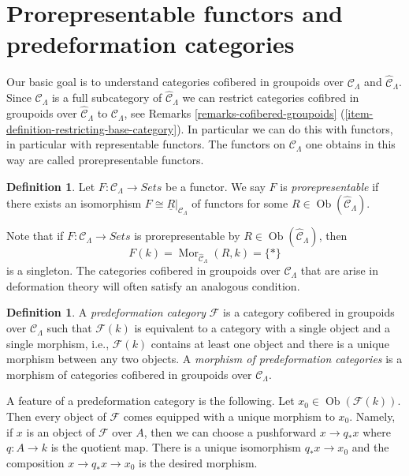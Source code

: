 \documentclass{stacks-project}
\theoremstyle{plain}
\theoremstyle{definition}
\newtheorem{definition}[subsection]{Definition}
\theoremstyle{remark}
\numberwithin{equation}{subsection}
\def\Mor{\mathop{\mathrm{Mor}}\nolimits}
\def\Ob{\mathop{\mathrm{Ob}}\nolimits}
\begin{document}
\section{Prorepresentable functors and predeformation categories}
\label{section-cofibered-groupoids}

\noindent
Our basic goal is to understand categories cofibered in groupoids over
$\mathcal{C}_\Lambda$ and $\widehat{\mathcal{C}}_\Lambda$. Since
$\mathcal{C}_\Lambda$ is a full subcategory of
$\widehat{\mathcal{C}}_\Lambda$ we can restrict categories cofibred in
groupoids over $\widehat{\mathcal{C}}_\Lambda$ to $\mathcal{C}_\Lambda$, see
Remarks \ref{remarks-cofibered-groupoids}
(\ref{item-definition-restricting-base-category}).
In particular we can do this with functors, in particular with
representable functors. The functors on $\mathcal{C}_\Lambda$
one obtains in this way are called
prorepresentable functors.

\begin{definition}
\label{definition-prorepresentable}
Let $F : \mathcal{C}_\Lambda \to \textit{Sets}$ be a functor.
We say $F$ is {\it prorepresentable} if there exists an isomorphism
$F \cong \underline{R}|_{\mathcal{C}_\Lambda}$ of functors for some
$R \in \Ob(\widehat{\mathcal{C}}_\Lambda)$.
\end{definition}

\noindent
Note that if $F : \mathcal{C}_\Lambda \to \textit{Sets}$ is prorepresentable
by $R \in \Ob(\widehat{\mathcal{C}}_\Lambda)$, then
$$
F(k) = \Mor_{\widehat{\mathcal{C}}_\Lambda}(R, k) = \{*\}
$$
is a singleton. The categories cofibered in groupoids over
$\mathcal{C}_\Lambda$ that are arise in deformation theory will often satisfy
an analogous condition.

\begin{definition}
\label{definition-predeformation-category}
A {\it predeformation category} $\mathcal{F}$ is a category cofibered
in groupoids over $\mathcal{C}_\Lambda$ such that $\mathcal{F}(k)$ is
equivalent to a category with a single object and a single morphism,
i.e., $\mathcal{F}(k)$ contains at least one object and there is a
unique morphism between any two objects. A {\it morphism of predeformation
categories} is a morphism of categories cofibered in groupoids over
$\mathcal{C}_\Lambda$.
\end{definition}

\noindent
A feature of a predeformation category is the following.
Let $x_0 \in \Ob(\mathcal{F}(k))$. Then every object of
$\mathcal{F}$ comes equipped with a unique morphism to $x_0$.
Namely, if $x$ is an object of $\mathcal{F}$ over $A$, then we
can choose a pushforward $x \to q_*x$ where $q : A \to k$ is the quotient
map. There is a unique isomorphism $q_*x \to x_0$ and the composition
$x \to q_*x \to x_0$ is the desired morphism.
\end{document}
